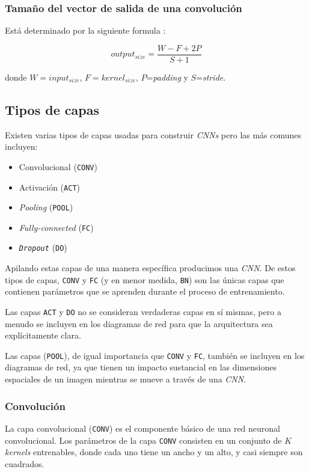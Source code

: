 \documentclass[a4paper,12pt]{article}
\begin{document}
\subsubsection{Tamaño del vector de salida de una convolución}

Está determinado por la siguiente formula \citep{SOOutputConv}:

$$ output_{size} = \frac{W-F+2P}{S+1}$$

donde $W = input_{size}$, $F=kernel_{size}$, $P$=\textit{padding} y $S$=\textit{stride}.

\subsection{Tipos de capas}
Existen varias tipos de capas usadas \citep{rosebrock2017deep} para construir \textit{CNNs} pero las más comunes incluyen:

\begin{itemize}[noitemsep, topsep=2pt]
	\item Convolucional (\texttt{CONV})
	\item Activación (\texttt{ACT})
	\item \textit{Pooling} (\texttt{POOL})
	\item \textit{Fully-connected} (\texttt{FC})
	\item \texttt{\textit{Dropout}} (\texttt{DO})
\end{itemize}

Apilando estas capas de una manera específica producimos una \textit{CNN}. De estos tipos de capas, \texttt{CONV} y \texttt{FC} (y en menor medida, \texttt{BN}) son las únicas capas que contienen parámetros que se aprenden durante el proceso de entrenamiento.

Las capas \texttt{ACT} y \texttt{DO} no se consideran verdaderas capas en sí mismas, pero a menudo se incluyen en los diagramas de red para que la arquitectura sea explícitamente clara.

Las capas (\texttt{POOL}), de igual importancia que \texttt{CONV} y \texttt{FC}, también se incluyen en los diagramas de red, ya que tienen un impacto sustancial en las dimensiones espaciales de un
imagen mientras se mueve a través de una \textit{CNN}.

\subsubsection{Convolución}

La capa convolucional (\texttt{CONV}) es el componente básico de una red neuronal convolucional. Los parámetros de la capa \texttt{CONV} consisten en un conjunto de $K$ \textit{kernels} entrenables, donde cada uno tiene un ancho y un alto, y casi siempre son cuadrados. 
\end{document}
